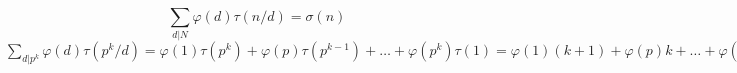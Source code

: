 

	$$\sum_{d|N} \varphi(d)\tau(n/d) = \sigma(n)$$
	$\sum_{d|p^k} \varphi(d)\tau(p^k/d) = \varphi(1)\tau(p^k) + \varphi(p)\tau(p^{k-1}) + \ldots + \varphi(p^k)\tau(1) = \varphi(1)(k+1) + \varphi(p)k + \ldots + \varphi(p^k)(k+1) = (k+1) + (p-1)k + \ldots + (p^k - p^{k-1}) = k + k(p-1) + \ldots + k(p^k - p^{k-1}) + (k+1) = k(1 + (p-1) + \ldots + (p^k - p^{k-1})) + (k+1) = k(p^k - 1) + (k+1) = kp^k - k + k + 1 = p^{k+1} - 1 = \sigma(p^k$

